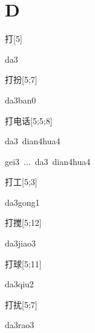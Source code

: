 ﻿%
\section*{D}

\begin{verbete}[da3]{打}[5]
\begin{pronuncia}{da3}
\end{pronuncia}
\end{verbete}

\begin{verbete}[da3ban0]{打扮}[5;7]
\begin{pronuncia}{da3ban0}
\end{pronuncia}
\end{verbete}

\begin{verbete}{打电话}[5;5;8]
\begin{pronuncia}{da3\ dian4hua4}
\end{pronuncia}
\begin{pronuncia}{gei3\ ...\ da3\ dian4hua4}
\end{pronuncia}
\end{verbete}

\begin{verbete}[da3gong1]{打工}[5;3]
\begin{pronuncia}{da3gong1}
\end{pronuncia}
\end{verbete}

\begin{verbete}[da3jiao3]{打搅}[5;12]
\begin{pronuncia}{da3jiao3}
\end{pronuncia}
\end{verbete}

\begin{verbete}[da3qiu2]{打球}[5;11]
\begin{pronuncia}{da3qiu2}
\end{pronuncia}
\end{verbete}

\begin{verbete}[da3rao3]{打扰}[5;7]
\begin{pronuncia}{da3rao3}
\end{pronuncia}
\end{verbete}

